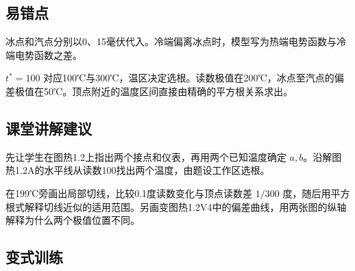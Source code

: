 \documentclass[UTF8,fontset=fandol,a4paper,11pt]{ctexart}
\begin{document}


\subsection*{易错点}

冰点和汽点分别以0、15毫伏代入。冷端偏离冰点时，模型写为热端电势函数与冷端电势函数之差。

$t^*=100$ 对应100℃与300℃，温区决定选根。读数极值在200℃，冰点至汽点的偏差极值在50℃。顶点附近的温度区间直接由精确的平方根关系求出。



\subsection*{课堂讲解建议}

先让学生在图热1.2上指出两个接点和仪表，再用两个已知温度确定 $a,b$。沿解图热1.2A的水平线从读数100找出两个温度，由题设工作区选根。

在199℃旁画出局部切线，比较0.1度读数变化与顶点读数差 $1/300$ 度，随后用平方根式解释切线近似的适用范围。另画变图热1.2V4中的偏差曲线，用两张图的纵轴解释为什么两个极值位置不同。




\subsection*{变式训练}
\end{document}

